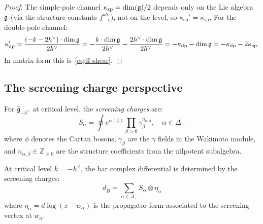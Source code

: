 \begin{proof}
The simple-pole channel $\kappa_{\mathrm{sp}} =
\dim(\mathfrak{g})/2$ depends only on the Lie algebra~$\mathfrak{g}$ (via the
structure constants $f^{ab}{}_c$), not on the level, so
$\kappa_{\mathrm{sp}}' = \kappa_{\mathrm{sp}}$.
For the double-pole channel:
\[
\kappa_{\mathrm{dp}}'
= \frac{(-k - 2h^\vee) \cdot \dim\mathfrak{g}}{2h^\vee}
= -\frac{k \cdot \dim\mathfrak{g}}{2h^\vee}
  - \frac{2h^\vee \cdot \dim\mathfrak{g}}{2h^\vee}
= -\kappa_{\mathrm{dp}} - \dim\mathfrak{g}
= -\kappa_{\mathrm{dp}} - 2\kappa_{\mathrm{sp}}.
\]
In matrix form this is~\eqref{eq:ff-shear}.
\end{proof}

\subsection{The screening charge perspective}

\begin{definition}
For $\widehat{\mathfrak{g}}_{-h^\vee}$ at critical level, the \emph{screening charges} are:
\begin{equation}
S_\alpha = \oint e^{\alpha(\phi)} \prod_{\beta > 0} \gamma_\beta^{n_{\alpha,\beta}}, \quad \alpha \in \Delta_+
\end{equation}
where $\phi$ denotes the Cartan bosons, $\gamma_\beta$ are the $\gamma$ fields in the Wakimoto module, and $n_{\alpha,\beta} \in \mathbb{Z}_{\geq 0}$ are the structure coefficients from the nilpotent subalgebra.
\end{definition}

\begin{theorem}\label{thm:screening-bar}
At critical level $k = -h^\vee$, the bar complex differential is determined by the screening charges:
\begin{equation}
d_{\bar{B}} = \sum_{\alpha \in \Delta_+} S_\alpha \otimes \eta_\alpha
\end{equation}
where $\eta_\alpha = d\log(z - w_\alpha)$ is the propagator form associated to the screening vertex at $w_\alpha$.
\end{theorem}

